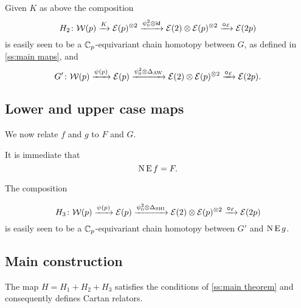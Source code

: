 \sssec

\TBW

\sssec

Given $K$ as above the composition
\[
H_2 \colon \mathcal{W}(p) \xrightarrow{K} \mathcal{E}(p)^{\otimes 2} \xrightarrow{\psi^2_0 \otimes \mathsf{id}} \mathcal{E}(2) \otimes \mathcal{E}(p)^{\otimes 2} \xrightarrow{\bm{\circ}_{\mathcal{E}}} \mathcal{E}(2p)
\]
is easily seen to be a $\mathbb{C}_p$-equivariant chain homotopy between $G$, as defined in \cref{ss:main maps}, and
\[
G' \colon \mathcal{W}(p) \xrightarrow{\psi(p)} \mathcal{E}(p) \xrightarrow{\psi^2_0 \otimes \Delta_{\operatorname{AW}}} \mathcal{E}(2) \otimes \mathcal{E}(p)^{\otimes 2} \xrightarrow{\bm{\circ}_{\mathcal{E}}} \mathcal{E}(2p).
\]

\subsection{Lower and upper case maps}

We now relate $f$ and $g$ to $F$ and $G$.

\sssec

It is immediate that
\[
\operatorname{N}\operatorname{E} f = F.
\]

\sssec

The composition

\[
H_3 \colon \mathcal{W}(p) \xrightarrow{\psi(p)} \mathcal{E}(p) \xrightarrow{\psi^2_0 \otimes \Delta_{\mathrm{SHI}}} \mathcal{E}(2) \otimes \mathcal{E}(p)^{\otimes 2} \xrightarrow{\bm{\circ}_{\mathcal{E}}} \mathcal{E}(2p)
\]
is easily seen to be a $\mathbb{C}_p$-equivariant chain homotopy between $G'$ and $\operatorname{N}\operatorname{E} g$.

\subsection{Main construction}

The map $H = H_1 + H_2 + H_3$ satisfies the conditions of \cref{ss:main theorem} and consequently defines Cartan relators.